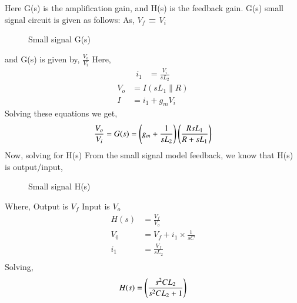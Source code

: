 \begin{enumerate}[label=\arabic*.,ref=\theenumi]
Here G(s) is the amplification gain, and H(s) is the feedback gain.\newline
G(s) small signal circuit is given as follows:\newline
As, \textbf{$V_f$ = $V_i$}\newline
\begin{figure}[!ht]
	\begin{center}
		\resizebox{\columnwidth}{!}{}
	\end{center}
\caption{Small signal G(s)}
\label{fig:ee18btech11019_fig8}
\end{figure}
and G(s) is given by, $\frac{V_o}{V_i}$\newline
Here,\newline
\begin{align}
    i_1 &= \frac{V_i}{sL_2}
\end{align}
\begin{align}
    V_o &= I(sL_1\parallel R)\\
    I &= i_1 + g_mV_i
\end{align}
Solving these equations we get,\newline
\begin{align}
    \frac{V_o}{V_i} = G(s) = \left(g_m + \frac{1}{sL_2}\right)\left(\frac{RsL_1}{R + sL_1}\right)
\end{align}
Now, solving for H(s)\newline
From the small signal model feedback, we know that H(s) is output/input, \newline
\begin{figure}[!ht]
	\begin{center}
		\resizebox{\columnwidth}{!}{}
	\end{center}
\caption{Small signal H(s)}
\label{fig:ee18btech11019_fig7}
\end{figure}
Where,\newline
Output is $V_f$\newline
Input is $V_o$ \newline
\begin{align}
H(s) &= \frac{V_f}{V_o}\\
V_0 &= V_f + i_1\times \frac{1}{sC}\\
i_1 &= \frac{V_f}{sL_2}\\
\end{align}
Solving,\newline
\begin{align}
    H(s) = \left(\frac{s^2CL_2}{s^2CL_2 +1}\right)
\end{align}

\end{enumerate}
